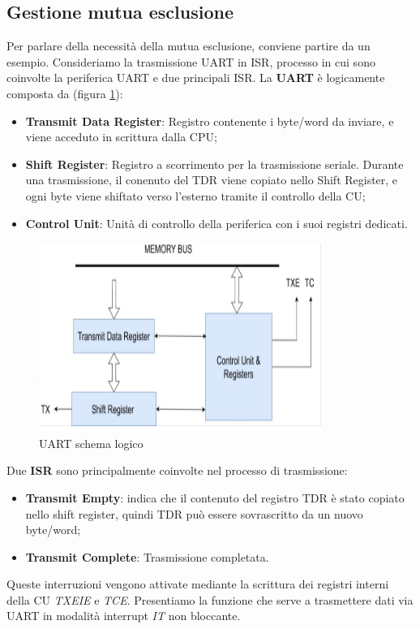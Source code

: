 \subsection{Gestione mutua esclusione}
Per parlare della necessità della mutua esclusione, conviene partire da un esempio.
Consideriamo la trasmissione UART in ISR, processo in cui sono coinvolte la periferica UART e due principali ISR. 
La \textbf{UART} è logicamente composta da (figura \ref{img:UART_logic_scheme}):
\begin{itemize}
    \item \textbf{Transmit Data Register}: Registro contenente i byte/word da inviare, e viene acceduto in scrittura dalla CPU;
    \item \textbf{Shift Register}: Registro a scorrimento per la trasmissione seriale. Durante una trasmissione, il conenuto del TDR viene copiato nello Shift Register, e ogni byte viene shiftato verso l'esterno tramite il controllo della CU;
    \item \textbf{Control Unit}: Unità di controllo della periferica con i suoi registri dedicati.
\end{itemize}

\begin{figure}[ht]
    \centering
    \includegraphics[width=.5\textwidth]{img/UART.png}
    \caption{UART schema logico}
    \label{img:UART_logic_scheme}
\end{figure}

Due \textbf{ISR} sono principalmente coinvolte nel processo di trasmissione:
\begin{itemize}
    \item \textbf{Transmit Empty}: indica che il contenuto del registro TDR è stato copiato nello shift register, quindi TDR può essere sovrascritto da un nuovo byte/word;
    \item \textbf{Transmit Complete}: Trasmissione completata.
\end{itemize}

Queste interruzioni vengono attivate mediante la scrittura dei registri interni della CU \textit{TXEIE} e \textit{TCE}.
Presentiamo la funzione che serve a trasmettere dati via UART in modalità interrupt \textit{IT} non bloccante. 


